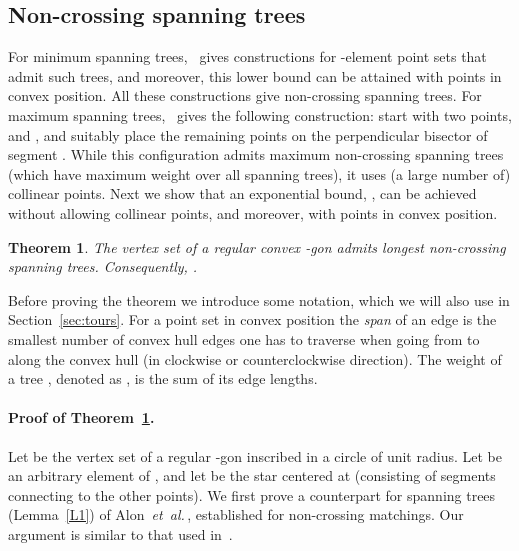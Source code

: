 \documentclass[11pt]{article}
\newtheorem{theorem}{Theorem}
\def\etal{{\it et~al.}\,}
\begin{document}
\subsection {Non-crossing spanning trees}
For minimum spanning trees,~\cite{D02} gives constructions
for -element point sets that admit
 such trees, and moreover, this lower bound
can be attained with points in convex position. All these
constructions give non-crossing spanning trees.
For maximum spanning trees,~\cite{D02} gives the following
construction: start with two points,
 and , and suitably place the remaining  points on the
perpendicular bisector of segment . While this configuration
admits  maximum non-crossing spanning trees
(which have maximum weight over all spanning trees), it uses (a large number of)
collinear points. Next we show that an exponential bound, , can be
achieved without allowing collinear points, and moreover, with points
in convex position.

\begin{theorem} \label{T3}
The vertex set of a regular convex -gon admits
 longest non-crossing spanning trees.
Consequently, .
\end{theorem}

Before proving the theorem we introduce some notation, which we will
also use in Section~\ref{sec:tours}.
For a point set in convex position the \emph{span} of an edge 
is the smallest number of convex hull edges one has to traverse
when going from  to  along the convex hull (in clockwise or counterclockwise direction).
The weight of a tree , denoted as , is the sum of its edge lengths.

\paragraph{Proof of Theorem~\ref{T3}.}
Let  be the vertex set of a regular -gon inscribed in a circle of unit radius.
Let  be an arbitrary element of , and let  be the star
centered at  (consisting of segments connecting  to the other
 points). We first prove a counterpart for spanning trees (Lemma~\ref{L1})
of Alon~\etal\cite[Lemma 2.2]{ARS95}, established for non-crossing matchings.
Our argument is similar to that used in~\cite{ARS95}.
\end{document}
